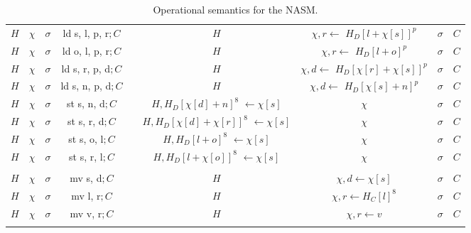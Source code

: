 \begin{xltabular}{\textwidth}{*{4}{>{\scriptsize}c}>{\tiny\bfseries}Y*{4}{>{\scriptsize}c}}
  $H$ & $\chi$ & $\sigma$ & ld s, l, p, r$; C$ &  & $H$ &  & $\sigma$ & $C$ \\
  $H$ & $\chi$ & $\sigma$ & ld o, l, p, r$; C$ &  & $H$ &  & $\sigma$ & $C$ \\
  $H$ & $\chi$ & $\sigma$ & ld s, r, p, d$;C$ &  & $H$ &  & $\sigma$ & $C$ \\
  $H$ & $\chi$ & $\sigma$ & ld s, n, p, d$;C$ &  & $H$ &  & $\sigma$ & $C$ \\
  $H$ & $\chi$ & $\sigma$ & st s, n, d$; C$ &  &  & $\chi$ & $\sigma$ & $C$ \\
  $H$ & $\chi$ & $\sigma$ & st s, r, d$; C$ &  &  & $\chi$ & $\sigma$ & $C$ \\
  $H$ & $\chi$ & $\sigma$ & st s, o, l$; C$ &  &  & $\chi$ & $\sigma$ & $C$ \\
  $H$ & $\chi$ & $\sigma$ & st s, r, l$; C$ &  &  & $\chi$ & $\sigma$ & $C$ \\

  \midrule

   \\

  $H$ & $\chi$ & $\sigma$ & mv s, d$; C$ &  & $H$ & $\chi, d \gets \chi[s]$ & $\sigma$ & $C$ \\
  $H$ & $\chi$ & $\sigma$ & mv l, r$; C$ &  & $H$ & $\chi, r \gets {H_{C}[l]}^{8}$ & $\sigma$ & $C$ \\
  $H$ & $\chi$ & $\sigma$ & mv v, r$; C$ &  & $H$ & $\chi, r \gets v$ & $\sigma$ & $C$ \\

  \bottomrule

  \caption{Operational semantics for the NASM.}
  \label{fig:nstar-nsam-core-opsemantics}
\end{xltabular}
